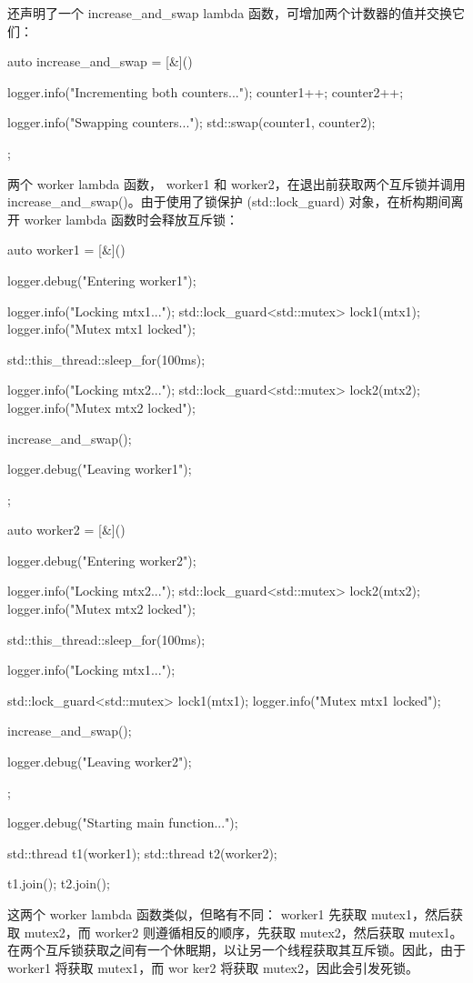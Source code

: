 还声明了一个 increase\_and\_swap lambda 函数，可增加两个计数器的值并交换它们：

\begin{cpp}
auto increase_and_swap = [&]() {
    logger.info("Incrementing both counters...");
    counter1++;
    counter2++;

    logger.info("Swapping counters...");
    std::swap(counter1, counter2);
};
\end{cpp}

两个 worker lambda 函数， worker1 和 worker2，在退出前获取两个互斥锁并调用 increase\_and\_swap()。由于使用了锁保护 (std::lock\_guard) 对象，在析构期间离开 worker lambda 函数时会释放互斥锁：

\begin{cpp}
auto worker1 = [&]() {
    logger.debug("Entering worker1");

    logger.info("Locking mtx1...");
    std::lock_guard<std::mutex> lock1(mtx1);
    logger.info("Mutex mtx1 locked");

    std::this_thread::sleep_for(100ms);

    logger.info("Locking mtx2...");
    std::lock_guard<std::mutex> lock2(mtx2);
    logger.info("Mutex mtx2 locked");

    increase_and_swap();

    logger.debug("Leaving worker1");
};

auto worker2 = [&]() {
    logger.debug("Entering worker2");

    logger.info("Locking mtx2...");
    std::lock_guard<std::mutex> lock2(mtx2);
    logger.info("Mutex mtx2 locked");

    std::this_thread::sleep_for(100ms);

    logger.info("Locking mtx1...");

    std::lock_guard<std::mutex> lock1(mtx1);
    logger.info("Mutex mtx1 locked");

    increase_and_swap();

    logger.debug("Leaving worker2");
};

logger.debug("Starting main function...");

std::thread t1(worker1);
std::thread t2(worker2);

t1.join();
t2.join();
\end{cpp}

这两个 worker lambda 函数类似，但略有不同： worker1 先获取 mutex1，然后获取 mutex2，而 worker2 则遵循相反的顺序，先获取 mutex2，然后获取 mutex1。在两个互斥锁获取之间有一个休眠期，以让另一个线程获取其互斥锁。因此，由于 worker1 将获取 mutex1，而 wor ker2 将获取 mutex2，因此会引发死锁。

